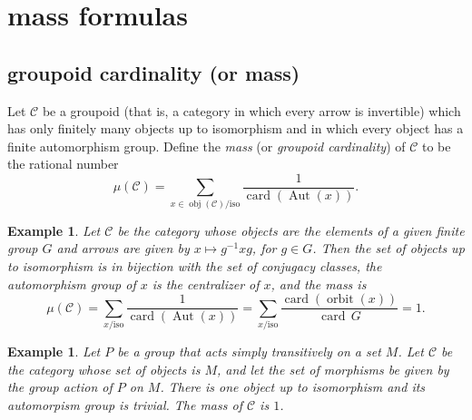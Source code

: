 \documentclass[brochure,english,12pt]{bourbaki}
\theoremstyle{plain}
\newtheorem{example}[equation]{Example}
\def\op#1{{\operatorname{#1}}}
\def\card{\op{card}}
\def\C{{\mathcal C}}
\begin{document}




\section{mass formulas}

\subsection{groupoid cardinality (or mass)}

Let ${\C}$ be a groupoid (that is, a category in which every arrow is
invertible) which has only finitely many objects up to isomorphism and
in which every object has a finite automorphism group.  Define the
{\it mass} (or {\it groupoid cardinality}) of $\C$  to be the rational
number
\[
\mu(\C)= \sum_{x\in \op{obj}(\C)/\text{iso}} \frac{1}{\op{card}(\op{Aut}(x))}.
\]

\begin{example}
  Let ${\C}$ be the category whose objects are the
  elements of a given finite group $G$ and arrows are given by $x \mapsto g^{-1}
  x g$, for $g\in G$.  Then the set of objects up to isomorphism
  is in bijection with the set of conjugacy classes, the automorphism
  group of $x$ is the centralizer of $x$, and the mass is
\[
\mu(\C) = \sum_{x/\text{iso}} \frac{1}{\op{card}(\op{Aut}(x))} = 
\sum_{x/\text{iso}} \frac{\op{card}(\op{orbit}(x))}{\card{\,G}} = 1.
\]
\end{example}

\begin{example}  Let $P$ be a group that acts simply transitively on a set $M$.
Let ${\C}$ be the category whose set of objects is $M$, and let the set of morphisms
be given by the group action of $P$ on $M$.  There is one object up to isomorphism
and its automorpism group is trivial.  The mass of $\C$ is $1$.
\end{example}
\end{document}

